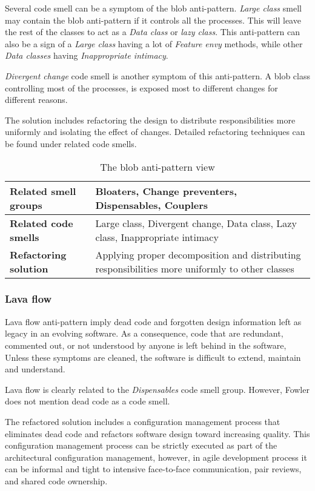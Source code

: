 Several code smell can be a symptom of the blob anti-pattern. \textit{Large class} smell may contain the blob anti-pattern if it controls all the processes. This will leave the rest of the classes to act as a \textit{Data class} or \textit{lazy class}. This anti-pattern can also be a sign of a \textit{Large class} having a lot of \textit{Feature envy} methods, while other \textit{Data classes} having \textit{Inappropriate intimacy}. 

\textit{Divergent change} code smell is another symptom of this anti-pattern. A blob class controlling most of the processes, is exposed most to different changes for different reasons.

The solution includes refactoring the design to distribute responsibilities more uniformly and isolating the effect of changes. Detailed refactoring techniques can be found under related code smells. 

\begin{table}[ht!]
\centering
\caption{The blob anti-pattern view}
\label{table:blob}
    \begin{tabular}{ p{5cm} p{9cm} }
     \hline
     \textbf{Related smell groups}   &Bloaters, Change preventers, Dispensables, Couplers\\ 
     \hline
     \textbf{Related code smells}   &Large class, Divergent change, Data class, Lazy class, Inappropriate intimacy\\ 
     \hline
     \textbf{Refactoring solution}  &Applying proper decomposition and distributing responsibilities more uniformly to other classes\\ 
     \hline
    \end{tabular}
\end{table}

\subsubsection*{Lava flow}
Lava flow anti-pattern imply dead code and forgotten design information left as legacy in an evolving software. As a consequence, code that are redundant, commented out, or not understood by anyone is left behind in the software, Unless these symptoms are cleaned, the software is difficult to extend, maintain and understand. 

Lava flow is clearly related to the \textit{Dispensables} code smell group. However, Fowler \cite{fowlerRefactor} does not mention dead code as a code smell. 

The refactored solution includes a configuration management process that eliminates dead code and refactors software design toward increasing quality. This configuration management process can be strictly executed as part of the architectural configuration management, however, in agile development process it can be informal and tight to intensive face-to-face communication, pair reviews, and shared code ownership. 

